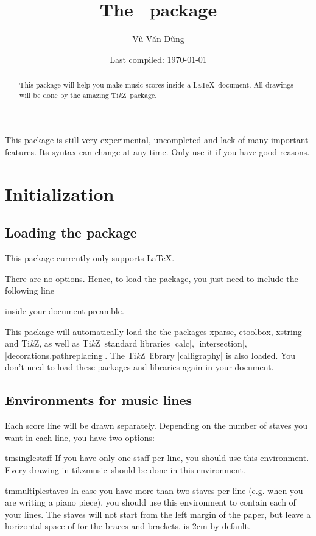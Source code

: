 \documentclass[11pt,a4paper]{ltxdoc}
\title{The \tmname\ package}
\author{Vũ Văn Dũng}
\date{Last compiled: \today}
\newcommand\pkg[1]{{\sffamily #1}}
\newcommand\tmname{\pkg{tikzmusic}}
\newcommand\tikzname{Ti\emph{k}Z}
\begin{document}
\maketitle
\begin{abstract}
  This package will help you make music scores inside a \LaTeX\ document. All 
  drawings will be done by the amazing \tikzname\ package.
\end{abstract}
\begin{caution}
  This package is still very experimental, uncompleted and lack of many important 
  features. Its syntax can change at any time. Only use it if you have good 
  reasons.
\end{caution}
\tableofcontents
\setlength\parskip{1ex}
\section{Initialization}\label{sec:init}
\subsection{Loading the package}\label{sec:init:load}
This package currently only supports \LaTeX.

There are no options. Hence, to load the package, you just need to 
include the following line
\begin{dispListing}
\usepackage{tikzmusic}
\end{dispListing}
inside your document preamble.

This package will automatically load the the packages \pkg{xparse}, \pkg{etoolbox}, 
\pkg{xstring} and \tikzname, as well as \tikzname\ standard libraries |calc|, 
|intersection|, |decorations.pathreplacing|. The \tikzname\ library |calligraphy| 
is also loaded. You don't need to load these packages and libraries again in your 
document.
\subsection{Environments for music lines}\label{sec:init:drawing-environment}
Each score line will be drawn separately. Depending on the number of staves you 
want in each line, you have two options:

\begin{docEnvironment}[doclang/environment content=music line]{tmsinglestaff}{}
  If you have only one staff per line, you should use this environment. 
  Every drawing in \tmname\ should be done in this environment.
\end{docEnvironment}
\begin{docEnvironment}[doclang/environment content=music line]{tmmultiplestaves}{}
  In case you have more than two staves per line (e.g. when you are writing a 
  piano piece), you should use this environment to contain each of your lines. 
  The staves will not start from the left margin of the paper, but leave a 
  horizontal space of  for the braces and brackets.  
  is $2$cm by default.
\end{docEnvironment}
\end{document}
